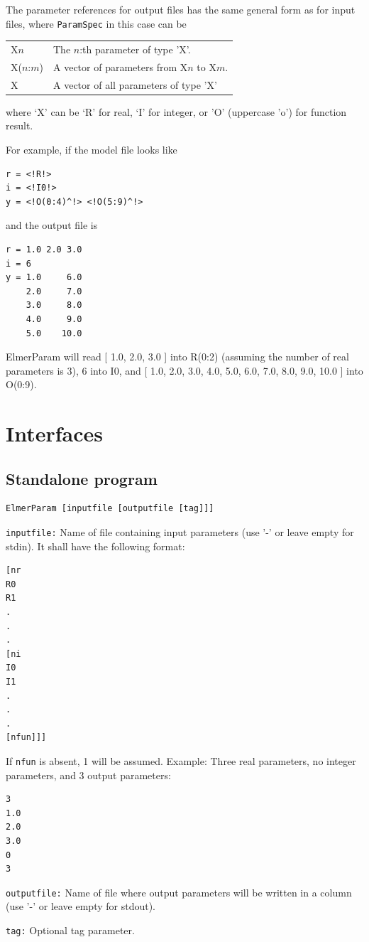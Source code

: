 \documentclass[12pt,a4paper]{article}
\newcommand{\code}[1]{\texttt{#1}}
\begin{document}
The parameter references for output files has the same general form as for
input files, where \code{ParamSpec} in this case can be
\begin{table}[H]
\begin{tabular}{ll}
X$n$        & The $n$:th parameter of type 'X'.\\
X($n$:$m$)  & A vector of parameters from X$n$ to X$m$.\\
X           & A vector of all parameters of type 'X'\\
\end{tabular}
\end{table}
\noindent where `X' can be `R' for real, `I' for integer, or 'O' (uppercase
'o') for function result.

For example, if the model file looks like
\begin{verbatim}
r = <!R!>
i = <!I0!>
y = <!O(0:4)^!> <!O(5:9)^!>
\end{verbatim}
and the output file is
\begin{verbatim}
r = 1.0 2.0 3.0
i = 6
y = 1.0     6.0
    2.0     7.0
    3.0     8.0
    4.0     9.0
    5.0    10.0
\end{verbatim}
ElmerParam will read [ 1.0, 2.0, 3.0 ] into R(0:2)
(assuming the number of real parameters is 3), 6 into I0, and
[ 1.0, 2.0, 3.0, 4.0, 5.0, 6.0, 7.0, 8.0, 9.0, 10.0 ] into O(0:9).

\section{Interfaces}

\subsection{Standalone program}

\begin{verbatim}
ElmerParam [inputfile [outputfile [tag]]]
\end{verbatim}
\begin{description}
\item{\tt inputfile:} Name of file containing input parameters (use '-' or
leave empty for
stdin).  It shall have the following format:
\begin{verbatim}
[nr
R0
R1
.
.
.
[ni
I0
I1
.
.
.
[nfun]]]
\end{verbatim}
If \texttt{nfun} is absent, 1 will be assumed.  Example:  Three real
parameters, no integer parameters, and 3 output parameters:
\begin{verbatim}
3
1.0
2.0
3.0
0
3
\end{verbatim}
\item{\tt outputfile:} Name of file where output parameters will be written
in a column (use '-' or leave empty for stdout).
\item{\tt tag:} Optional tag parameter.
\end{description}
\end{document}
